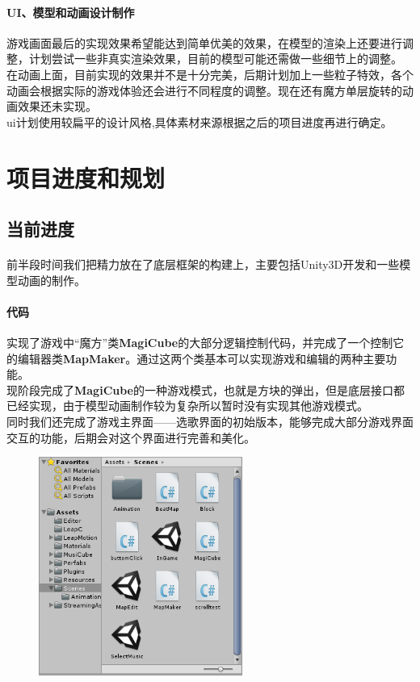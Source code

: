 \documentclass{article}
\begin{document}
\paragraph{UI、模型和动画设计制作}
游戏画面最后的实现效果希望能达到简单优美的效果，在模型的渲染上还要进行调整，计划尝试一些非真实渲染效果，目前的模型可能还需做一些细节上的调整。\\
在动画上面，目前实现的效果并不是十分完美，后期计划加上一些粒子特效，各个动画会根据实际的游戏体验还会进行不同程度的调整。现在还有魔方单层旋转的动画效果还未实现。\\
ui计划使用较扁平的设计风格,具体素材来源根据之后的项目进度再进行确定。
\section{项目进度和规划}
\subsection{当前进度}
\paragraph{}
前半段时间我们把精力放在了底层框架的构建上，主要包括Unity3D开发和一些模型动画的制作。
\paragraph{代码}
实现了游戏中“魔方”类\textbf{MagiCube}的大部分逻辑控制代码，并完成了一个控制它的编辑器类\textbf{MapMaker}。通过这两个类基本可以实现游戏和编辑的两种主要功能。\\
现阶段完成了\textbf{MagiCube}的一种游戏模式，也就是方块的弹出，但是底层接口都已经实现，由于模型动画制作较为复杂所以暂时没有实现其他游戏模式。\\
同时我们还完成了游戏主界面——选歌界面的初始版本，能够完成大部分游戏界面交互的功能，后期会对这个界面进行完善和美化。
\begin{figure}[H]
  \centering
  \includegraphics[width=18em]{work.png}\\
  \caption{}\label{}
\end{figure}
\end{document}
